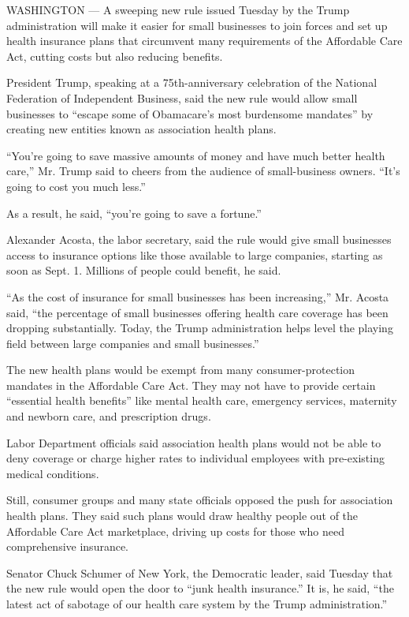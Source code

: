 WASHINGTON --- A sweeping new rule issued Tuesday by the Trump
administration will make it easier for small businesses to join forces
and set up health insurance plans that circumvent many requirements of
the Affordable Care Act, cutting costs but also reducing benefits.

President Trump, speaking at a 75th-anniversary celebration of the
National Federation of Independent Business, said the new rule would
allow small businesses to ``escape some of Obamacare's most burdensome
mandates'' by creating new entities known as association health plans.

``You're going to save massive amounts of money and have much better
health care,'' Mr. Trump said to cheers from the audience of
small-business owners. ``It's going to cost you much less.''

As a result, he said, ``you're going to save a fortune.''

Alexander Acosta, the labor secretary, said the rule would give small
businesses access to insurance options like those available to large
companies, starting as soon as Sept. 1. Millions of people could
benefit, he said.

``As the cost of insurance for small businesses has been increasing,''
Mr. Acosta said, ``the percentage of small businesses offering health
care coverage has been dropping substantially. Today, the Trump
administration helps level the playing field between large companies and
small businesses.''

The new health plans would be exempt from many consumer-protection
mandates in the Affordable Care Act. They may not have to provide
certain ``essential health benefits'' like mental health care, emergency
services, maternity and newborn care, and prescription drugs.

Labor Department officials said association health plans would not be
able to deny coverage or charge higher rates to individual employees
with pre-existing medical conditions.

Still, consumer groups and many state officials opposed the push for
association health plans. They said such plans would draw healthy people
out of the Affordable Care Act marketplace, driving up costs for those
who need comprehensive insurance.

Senator Chuck Schumer of New York, the Democratic leader, said Tuesday
that the new rule would open the door to ``junk health insurance.'' It
is, he said, ``the latest act of sabotage of our health care system by
the Trump administration.''

